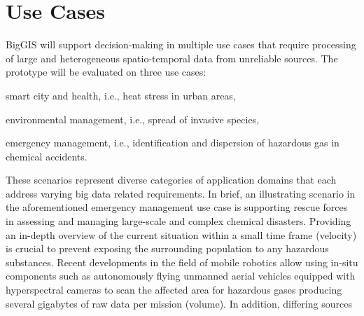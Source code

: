 \documentclass{sig-alternate-05-2015}
\begin{document}
\section{Use Cases}
\label{sec:use}
BigGIS will support decision-making in multiple use cases that require
processing of large and heterogeneous spatio-temporal data from unreliable
sources. The prototype will be evaluated on three use cases: 
\begin{inparaenum}[(1)]
	\item smart city and health, i.e., heat stress in urban areas,
	\item environmental management, i.e., spread of invasive species,
	\item emergency management, i.e., identification and dispersion of hazardous
gas in chemical accidents.
\end{inparaenum}
These scenarios represent diverse categories of application domains that each 
address varying big data related requirements. 
In brief, an illustrating scenario in the aforementioned emergency management
use case is supporting rescue forces in assessing and managing large-scale and
complex chemical disasters. Providing an in-depth overview of the current
situation within a small time frame (velocity) is crucial to prevent exposing
the surrounding population to any hazardous substances. Recent developments in
the field of mobile robotics allow using in-situ components such as
autonomously flying unmanned aerial vehicles equipped with hyperspectral
cameras to scan the affected area for hazardous gases producing several
gigabytes of raw data per mission (volume). In addition, differing sources
\end{document}
